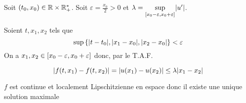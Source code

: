 {\begin{td-sol}[]
\begin{itemize}
			Soit \((t_0,x_0)\in\mathbb{R}\times\mathbb{R}_+^*\). Soit \(\varepsilon=\frac{x_0}{2}>0\)
			et \(\lambda=\sup\limits_{\mathopen{}\left[x_0-\varepsilon,x_0+\varepsilon\right]\mathclose{}}\mathopen{}\left|u'\right|\mathclose{}\).

			Soient \(t,x_1,x_2\) tels que
			\begin{equation*}
				\sup{\{\mathopen{}\left|t-t_0\right|\mathclose{},\mathopen{}\left|x_1-x_0\right|\mathclose{},\mathopen{}\left|x_2-x_0\right|\mathclose{}\}}<\varepsilon
			\end{equation*}
			On a \(x_1,x_2\in\mathopen{}\left[x_0-\varepsilon,x_0+\varepsilon\right]\mathclose{}\) donc, par le
			T.A.F.

			\begin{equation*}
				\mathopen{}\left|f(t,x_1)-f(t,x_2)\right|\mathclose{}=\mathopen{}\left|u(x_1)-u(x_2)\right|\mathclose{}\le \lambda \mathopen{}\left|x_1-x_2\right|\mathclose{}
			\end{equation*}

			\(f\) est continue et localement Lipschitzienne en espace donc il existe
			une unique solution maximale

		\end{itemize}
	\end{td-sol}
}{}

\begin{td-exo}[] %
\end{td-exo}


